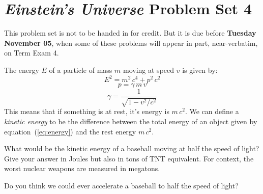 \documentclass[12pt, letterpaper]{article}
\begin{document}
\section*{\textsl{Einstein's Universe} Problem Set 4}

This problem set is not to be handed in for credit. But it is due
before \textbf{Tuesday November 05}, when some of these problems
will appear in part, near-verbatim, on Term Exam 4.

\begin{problem}
The energy $E$ of a particle of mass $m$ moving
at speed $v$ is given by:
\begin{equation}\label{eq:energy}
E^2 = m^2\,c^4 + p^2\,c^2
\end{equation}
\begin{equation}
p = \gamma\,m\,v
\end{equation}
\begin{equation}
\gamma = \frac{1}{\sqrt{1 - v^2/c^2}}
\end{equation}
This means that if something is at rest, it's energy is $m\,c^2$.
We can define a \emph{kinetic energy} to be the difference
between the total energy of an object given by
equation~(\ref{eq:energy}) and the rest energy $m\,c^2$.

What would be the kinetic energy of a baseball moving at half the
speed of light? Give your answer in Joules but also in tons of TNT
equivalent. For context, the worst nuclear weapons are measured in
megatons.

Do you think we could ever accelerate a baseball to half the speed of
light?
\end{problem}
\end{document}

